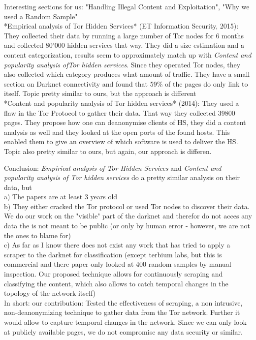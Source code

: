Interesting sections for us: "Handling Illegal Content and Exploitation", "Why we used a Random Sample"\\
*Empirical analysis of Tor Hidden Services* (ET Information Security, 2015): They collected their data by running a large number of Tor nodes for 6 months and collected 80'000 hidden services that way. They did a size estimation and a content categorization, results seem to approximately match up with \textit{Content and popularity analysis ofTor hidden services}. Since they operated Tor nodes, they also collected which category produces what amount of traffic. They have a small section on Darknet connectivity and found that 59\% of the pages do only link to itself.
Topic pretty similar to ours, but the approach is different \\   
*Content and popularity analysis of Tor hidden services* (2014): They used a flaw in the Tor Protocol to gather their data. That way they collected 39800 pages. They propose how one can deanonymise clients of HS, they did a content analysis as well and they looked at the open ports of the found hosts. This enabled them to give an overview of which software is used to deliver the HS.
Topic also pretty similar to ours, but again, our approach is differen.

Conclusion: \textit{Empirical analysis of Tor Hidden Services} and \textit{Content and popularity analysis of Tor hidden services} do a pretty similar analysis on their data, but\\
a) The papers are at least 3 years old \\
b) They either cracked the Tor protocol or used Tor nodes to discover their data. We do our work on the "visible" part of the darknet and therefor do not acces any data the is not meant to be public (or only by human error - however, we are not the ones to blame for)\\
c) As far as I know there does not exist any work that has tried to apply a scraper to the darknet for classification (except terbium labs, but this is commercial and there paper only looked at 400 random samples by manual inspection. Our proposed technique allows for continuously scraping and classifying the content, which also allows to catch temporal changes in the topology of the network itself)\\
In short: our contribution: Tested the effectiveness of scraping, a non intrusive, non-deanonymizing technique to gather data from the Tor network. Further it would allow to capture temporal changes in the network. Since we can only look at publicly available pages, we do not compromise any data security or similar.


